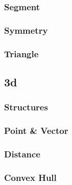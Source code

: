 \subsubsection{Segment}


\subsubsection{Symmetry}


\subsubsection{Triangle}



\subsection{3d}
\subsubsection{Structures}


\subsubsection{Point \& Vector}


\subsubsection{Distance}


\subsubsection{Convex Hull}


